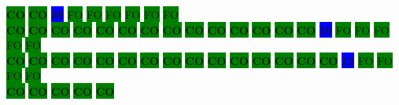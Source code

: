 \colorbox{green}{\color[rgb]{0,0,0}\textbf{CO}}%
\colorbox{green}{\color[rgb]{0,0,0}\textbf{CO}}%
\colorbox{blue}{\color[rgb]{1,0,0}\textbf{08}}%
\colorbox{green}{\color[gray]{0.75}FO}%
\colorbox{green}{\color[gray]{0.75}FO}%
\colorbox{green}{\color[gray]{0.75}FO}%
\colorbox{green}{\color[gray]{0.75}FO}%
\colorbox{green}{\color[gray]{0.75}FO}%
\colorbox{green}{\color[gray]{0.75}FO}%
\\
\colorbox{green}{\color[rgb]{0,0,0}\textbf{CO}}%
\colorbox{green}{\color[rgb]{0,0,0}\textbf{CO}}%
\colorbox{green}{\color[rgb]{0,0,0}\textbf{CO}}%
\colorbox{green}{\color[rgb]{0,0,0}\textbf{CO}}%
\colorbox{green}{\color[rgb]{0,0,0}\textbf{CO}}%
\colorbox{green}{\color[rgb]{0,0,0}\textbf{CO}}%
\colorbox{green}{\color[rgb]{0,0,0}\textbf{CO}}%
\colorbox{green}{\color[rgb]{0,0,0}\textbf{CO}}%
\colorbox{green}{\color[rgb]{0,0,0}\textbf{CO}}%
\colorbox{green}{\color[rgb]{0,0,0}\textbf{CO}}%
\colorbox{green}{\color[rgb]{0,0,0}\textbf{CO}}%
\colorbox{green}{\color[rgb]{0,0,0}\textbf{CO}}%
\colorbox{green}{\color[rgb]{0,0,0}\textbf{CO}}%
\colorbox{green}{\color[rgb]{0,0,0}\textbf{CO}}%
\colorbox{blue}{\color[rgb]{1,0,0}\textbf{10}}%
\colorbox{green}{\color[gray]{0.75}FO}%
\colorbox{green}{\color[gray]{0.75}FO}%
\colorbox{green}{\color[gray]{0.75}FO}%
\colorbox{green}{\color[gray]{0.75}FO}%
\colorbox{green}{\color[gray]{0.75}FO}%
\\
\colorbox{green}{\color[rgb]{0,0,0}\textbf{CO}}%
\colorbox{green}{\color[rgb]{0,0,0}\textbf{CO}}%
\colorbox{green}{\color[rgb]{0,0,0}\textbf{CO}}%
\colorbox{green}{\color[rgb]{0,0,0}\textbf{CO}}%
\colorbox{green}{\color[rgb]{0,0,0}\textbf{CO}}%
\colorbox{green}{\color[rgb]{0,0,0}\textbf{CO}}%
\colorbox{green}{\color[rgb]{0,0,0}\textbf{CO}}%
\colorbox{green}{\color[rgb]{0,0,0}\textbf{CO}}%
\colorbox{green}{\color[rgb]{0,0,0}\textbf{CO}}%
\colorbox{green}{\color[rgb]{0,0,0}\textbf{CO}}%
\colorbox{green}{\color[rgb]{0,0,0}\textbf{CO}}%
\colorbox{green}{\color[rgb]{0,0,0}\textbf{CO}}%
\colorbox{green}{\color[rgb]{0,0,0}\textbf{CO}}%
\colorbox{green}{\color[rgb]{0,0,0}\textbf{CO}}%
\colorbox{green}{\color[rgb]{0,0,0}\textbf{CO}}%
\colorbox{blue}{\color[rgb]{1,0,0}\textbf{12}}%
\colorbox{green}{\color[gray]{0.75}FO}%
\colorbox{green}{\color[gray]{0.75}FO}%
\colorbox{green}{\color[gray]{0.75}FO}%
\colorbox{green}{\color[gray]{0.75}FO}%
\\
\colorbox{green}{\color[rgb]{0,0,0}\textbf{CO}}%
\colorbox{green}{\color[rgb]{0,0,0}\textbf{CO}}%
\colorbox{green}{\color[rgb]{0,0,0}\textbf{CO}}%
\colorbox{green}{\color[rgb]{0,0,0}\textbf{CO}}%
\colorbox{green}{\color[rgb]{0,0,0}\textbf{CO}}%
